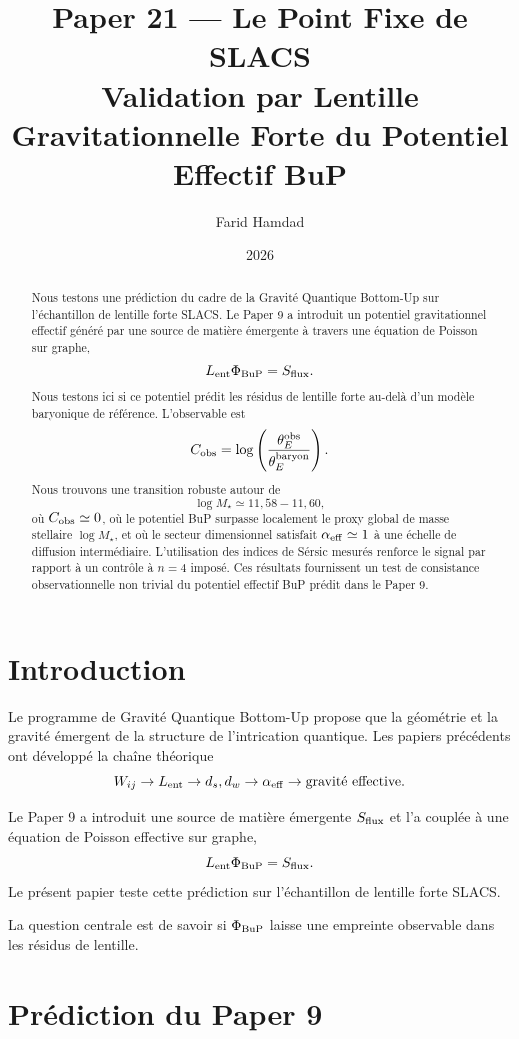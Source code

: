 \documentclass[11pt,a4paper]{article}
\title{
\textbf{Paper 21 --- Le Point Fixe de SLACS}\\
\large Validation par Lentille Gravitationnelle Forte du Potentiel Effectif BuP
}
\author{Farid Hamdad}
\affil{Programme de Gravité Quantique Bottom-Up}
\date{2026}
\begin{document}
\maketitle

\begin{abstract}
Nous testons une prédiction du cadre de la Gravité Quantique Bottom-Up sur l'échantillon de lentille forte SLACS. Le Paper 9 a introduit un potentiel gravitationnel effectif généré par une source de matière émergente à travers une équation de Poisson sur graphe,
\[
L_{\rm ent}\Phi_{\rm BuP}=S_{\rm flux}.
\]
Nous testons ici si ce potentiel prédit les résidus de lentille forte au-delà d'un modèle baryonique de référence. L'observable est
\[
C_{\rm obs}
=
\log\left(
\frac{\theta_E^{\rm obs}}
{\theta_E^{\rm baryon}}
\right).
\]
Nous trouvons une transition robuste autour de
\[
\log M_\star\simeq 11,58-11,60,
\]
où \(C_{\rm obs}\simeq0\), où le potentiel BuP surpasse localement le proxy global de masse stellaire \(\log M_\star\), et où le secteur dimensionnel satisfait \(\alpha_{\rm eff}\simeq1\) à une échelle de diffusion intermédiaire. L'utilisation des indices de Sérsic mesurés renforce le signal par rapport à un contrôle à \(n=4\) imposé. Ces résultats fournissent un test de consistance observationnelle non trivial du potentiel effectif BuP prédit dans le Paper 9.
\end{abstract}

\section{Introduction}

Le programme de Gravité Quantique Bottom-Up propose que la géométrie et la gravité émergent de la structure de l'intrication quantique. Les papiers précédents ont développé la chaîne théorique
\[
W_{ij}
\rightarrow
L_{\rm ent}
\rightarrow
d_s,d_w
\rightarrow
\alpha_{\rm eff}
\rightarrow
\text{gravité effective}.
\]

Le Paper 9 a introduit une source de matière émergente \(S_{\rm flux}\) et l'a couplée à une équation de Poisson effective sur graphe,
\[
L_{\rm ent}\Phi_{\rm BuP}=S_{\rm flux}.
\]
Le présent papier teste cette prédiction sur l'échantillon de lentille forte SLACS.

La question centrale est de savoir si \(\Phi_{\rm BuP}\) laisse une empreinte observable dans les résidus de lentille.

\section{Prédiction du Paper 9}
\end{document}
